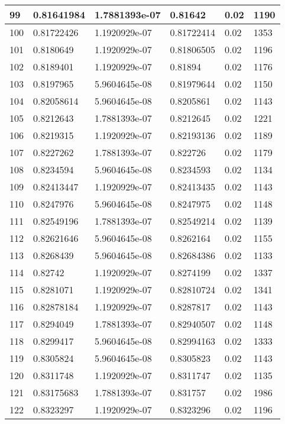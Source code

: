\begin{longtable}{|l|l|l|l|l|l|}
99 & 0.81641984 & 1.7881393e-07 & 0.81642 & 0.02 & 1190 \\ \hline 
100 & 0.81722426 & 1.1920929e-07 & 0.81722414 & 0.02 & 1353 \\ \hline 
101 & 0.8180649 & 1.1920929e-07 & 0.81806505 & 0.02 & 1196 \\ \hline 
102 & 0.8189401 & 1.1920929e-07 & 0.81894 & 0.02 & 1176 \\ \hline 
103 & 0.8197965 & 5.9604645e-08 & 0.81979644 & 0.02 & 1150 \\ \hline 
104 & 0.82058614 & 5.9604645e-08 & 0.8205861 & 0.02 & 1143 \\ \hline 
105 & 0.8212643 & 1.7881393e-07 & 0.8212645 & 0.02 & 1221 \\ \hline 
106 & 0.8219315 & 1.1920929e-07 & 0.82193136 & 0.02 & 1189 \\ \hline 
107 & 0.8227262 & 1.7881393e-07 & 0.822726 & 0.02 & 1179 \\ \hline 
108 & 0.8234594 & 5.9604645e-08 & 0.8234593 & 0.02 & 1134 \\ \hline 
109 & 0.82413447 & 1.1920929e-07 & 0.82413435 & 0.02 & 1143 \\ \hline 
110 & 0.8247976 & 5.9604645e-08 & 0.8247975 & 0.02 & 1148 \\ \hline 
111 & 0.82549196 & 1.7881393e-07 & 0.82549214 & 0.02 & 1139 \\ \hline 
112 & 0.82621646 & 5.9604645e-08 & 0.8262164 & 0.02 & 1155 \\ \hline 
113 & 0.8268439 & 5.9604645e-08 & 0.82684386 & 0.02 & 1133 \\ \hline 
114 & 0.82742 & 1.1920929e-07 & 0.8274199 & 0.02 & 1337 \\ \hline 
115 & 0.8281071 & 1.1920929e-07 & 0.82810724 & 0.02 & 1341 \\ \hline 
116 & 0.82878184 & 1.1920929e-07 & 0.8287817 & 0.02 & 1143 \\ \hline 
117 & 0.8294049 & 1.7881393e-07 & 0.82940507 & 0.02 & 1148 \\ \hline 
118 & 0.8299417 & 5.9604645e-08 & 0.82994163 & 0.02 & 1333 \\ \hline 
119 & 0.8305824 & 5.9604645e-08 & 0.8305823 & 0.02 & 1143 \\ \hline 
120 & 0.8311748 & 1.1920929e-07 & 0.8311747 & 0.02 & 1135 \\ \hline 
121 & 0.83175683 & 1.7881393e-07 & 0.831757 & 0.02 & 1986 \\ \hline 
122 & 0.8323297 & 1.1920929e-07 & 0.8323296 & 0.02 & 1196 \\ \hline 

\end{longtable}
